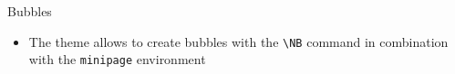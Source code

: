 \documentclass[10pt]{beamer}
\begin{document}

\begin{frame}
	{Bubbles}
	\begin{itemize}
		\item The theme allows to create bubbles with the \texttt{\textbackslash NB} command in combination with the \texttt{minipage} environment \bigskip
	\end{itemize}
	\begin{center}
		\begin{minipage}{.4\textwidth}
		\end{minipage}
	\end{center}
	\begin{center}
		\begin{minipage}{.6\textwidth}
		\end{minipage}
	\end{center}
	\begin{center}
		\begin{minipage}{.8\textwidth}
		\end{minipage}
	\end{center}
\end{frame}

\end{document}
